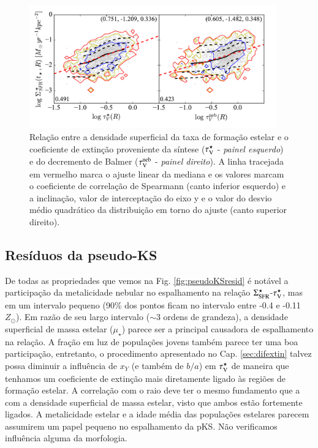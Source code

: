 \begin{figure}
	\centering
	\includegraphics[width=0.95\textwidth]{figuras/pseudoKS.pdf}
	\caption[Nossa {\em pseudo-KS}.]
	{Relação entre a densidade superficial da taxa de formação estelar e o coeficiente de extinção
proveniente da síntese ($\tau_{\mathrm{V}}^\star$ - {\em painel esquerdo}) e do decremento de Balmer ($\tau_{\mathrm{V}}^{\mathrm{neb}}$ -
{\em painel direito}). A linha tracejada em vermelho marca o ajuste linear da mediana e os
valores marcam o coeficiente de correlação de Spearmann (canto inferior esquerdo) e a
inclinação, valor de interceptação do eixo y e o valor do desvio médio quadrático da distribuição em
torno do ajuste (canto superior direito).}
	\label{fig:pseudoKS}
\end{figure}

\subsection{Resíduos da pseudo-KS}
\label{sec:gasfrac:KS:resid}
 
De todas as propriedades que vemos na Fig. \ref{fig:pseudoKSresid} é notável a participação da
metalicidade nebular no espalhamento na relação $\Sigma_{\mathrm{SFR}}^\star$-$\tau_{\mathrm{V}}^\star$, mas em um intervalo pequeno
(90\% dos pontos ficam no intervalo entre -0.4 e -0.11 $Z_\odot$). Em razão de seu largo intervalo
($\sim 3$ ordens de grandeza), a densidade superficial de massa estelar ($\mu_\star$) parece ser a
principal causadora de espalhamento na relação. A fração em luz de populações jovens também parece
ter uma boa participação, entretanto, o procedimento apresentado no Cap. \ref{sec:difextin} talvez
possa diminuir a influência de $x_Y$ (e também de $b/a$) em $\tau_{\mathrm{V}}^\star$ de maneira que tenhamos um
coeficiente de extinção mais diretamente ligado às regiões de formação estelar. A correlação com o
raio deve ter o mesmo fundamento que a com a densidade superficial de massa estelar, visto que ambos
estão fortemente ligados. A metalicidade estelar e a idade média das populações estelares parecem
assumirem um papel pequeno no espalhamento da pKS. Não verificamos influência alguma da morfologia.

